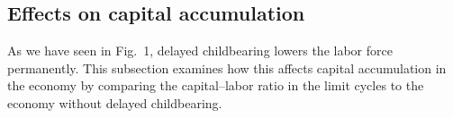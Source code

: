 \documentclass{MBE}%
\begin{document}
{%
%

\subsection{Effects on capital accumulation\label{subsec:Compare}}

As we have seen in Fig.~1, delayed childbearing lowers the labor force permanently. This
subsection examines how this affects capital accumulation in the economy by comparing the
capital--labor ratio in the limit cycles to the economy without delayed childbearing.

}
\end{document}
